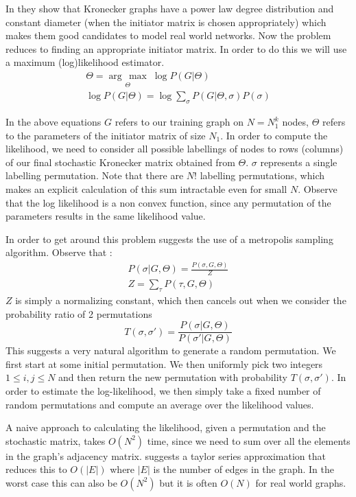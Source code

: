 \documentclass[dvips,12pt]{article}
\newcommand{\argmax}[1]{\underset{#1}{\operatorname{arg}\,\operatorname{max}}\;}
\begin{document}
In \cite{ghahramani2010} they show that Kronecker graphs have a power law degree distribution and constant diameter (when the initiator matrix is chosen appropriately) which makes them good candidates to model real world networks. Now the problem reduces to finding an appropriate initiator matrix. In order to do this we will use a maximum (log)likelihood estimator. 
\begin{gather}
\Theta = \argmax{\Theta} \log P(G|\Theta) \\
\log P(G|\Theta) = \log \sum_{\sigma} P(G|\Theta, \sigma) P(\sigma)
\end{gather}

In the above equations $G$ refers to our training graph on $N = N_1^k$ nodes, $\Theta$ refers to the parameters of the initiator matrix of size $N_1$. In order to compute the likelihood, we need to consider all possible labellings of nodes to rows (columns) of our final stochastic Kronecker matrix obtained from $\Theta$. $\sigma$ represents a single labelling permutation. Note that there are $N!$ labelling permutations, which makes an explicit calculation of this sum intractable even for small $N$. Observe that the log likelihood is a non convex function, since any permutation of the parameters results in the same likelihood value.

In order to get around this problem \cite{ghahramani2010} suggests the use of a metropolis sampling algorithm. Observe that :
\begin{gather}
P(\sigma|G, \Theta)  = \frac{P(\sigma, G, \Theta)}{Z} \\
Z = \sum_{\tau} P(\tau, G, \Theta)
\end{gather}
$Z$ is simply a normalizing constant, which then cancels out when we consider the probability ratio of 2 permutations $$T(\sigma, \sigma') = \frac{P(\sigma| G, \Theta)}{P(\sigma'| G, \Theta)}$$ This suggests a very natural algorithm to generate a random permutation. We first start at some initial permutation. We then uniformly pick two integers $1 \leq i,j\leq N$ and then return the new permutation with probability $T(\sigma, \sigma')$. In order to estimate the log-likelihood, we then simply take a fixed number of random permutations and compute an average over the likelihood values.

A naive approach to calculating the likelihood, given a permutation and the stochastic matrix, takes $O(N^2)$ time, since we need to sum over all the elements in the graph's adjacency matrix. \cite{ghahramani2010} suggests a taylor series approximation that reduces this to $O(|E|)$ where $|E|$ is the number of edges in the graph. In the worst case this can also be $O(N^2)$ but it is often $O(N)$ for real world graphs.
\end{document}
